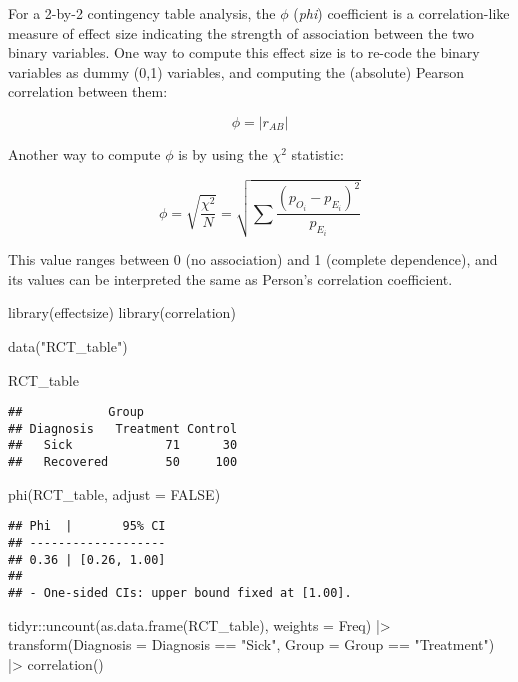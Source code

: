 \documentclass[
]{article}
\newenvironment{Shaded}{\begin{snugshade}}{\end{snugshade}}
\newcommand{\AttributeTok}[1]{\textcolor[rgb]{0.77,0.63,0.00}{#1}}
\newcommand{\ConstantTok}[1]{\textcolor[rgb]{0.00,0.00,0.00}{#1}}
\newcommand{\FunctionTok}[1]{\textcolor[rgb]{0.00,0.00,0.00}{#1}}
\newcommand{\NormalTok}[1]{#1}
\newcommand{\SpecialCharTok}[1]{\textcolor[rgb]{0.00,0.00,0.00}{#1}}
\newcommand{\StringTok}[1]{\textcolor[rgb]{0.31,0.60,0.02}{#1}}
\begin{document}
For a 2-by-2 contingency table analysis, the \(\phi\) (\emph{phi})
coefficient is a correlation-like measure of effect size indicating the
strength of association between the two binary variables. One way to
compute this effect size is to re-code the binary variables as dummy
(0,1) variables, and computing the (absolute) Pearson correlation
between them:

\[
\phi = |r_{AB}|
\]

Another way to compute \(\phi\) is by using the \(\chi^2\) statistic:

\[
\phi = \sqrt{\frac{\chi^2}{N}} = \sqrt{\sum{\frac{(p_{O_i}-p_{E_i})^2}{p_{E_i}}}}
\]

This value ranges between 0 (no association) and 1 (complete
dependence), and its values can be interpreted the same as Person's
correlation coefficient.

\begin{Shaded}
\begin{Highlighting}[]
\FunctionTok{library}\NormalTok{(effectsize)}
\FunctionTok{library}\NormalTok{(correlation)}

\FunctionTok{data}\NormalTok{(}\StringTok{"RCT\_table"}\NormalTok{)}

\NormalTok{RCT\_table}
\end{Highlighting}
\end{Shaded}

\begin{verbatim}
##            Group
## Diagnosis   Treatment Control
##   Sick             71      30
##   Recovered        50     100
\end{verbatim}

\begin{Shaded}
\begin{Highlighting}[]
\FunctionTok{phi}\NormalTok{(RCT\_table, }\AttributeTok{adjust =} \ConstantTok{FALSE}\NormalTok{)}
\end{Highlighting}
\end{Shaded}

\begin{verbatim}
## Phi  |       95% CI
## -------------------
## 0.36 | [0.26, 1.00]
## 
## - One-sided CIs: upper bound fixed at [1.00].
\end{verbatim}

\begin{Shaded}
\begin{Highlighting}[]
\NormalTok{tidyr}\SpecialCharTok{::}\FunctionTok{uncount}\NormalTok{(}\FunctionTok{as.data.frame}\NormalTok{(RCT\_table), }\AttributeTok{weights =}\NormalTok{ Freq) }\SpecialCharTok{|\textgreater{}}
  \FunctionTok{transform}\NormalTok{(}\AttributeTok{Diagnosis =}\NormalTok{ Diagnosis }\SpecialCharTok{==} \StringTok{"Sick"}\NormalTok{,}
            \AttributeTok{Group =}\NormalTok{ Group }\SpecialCharTok{==} \StringTok{"Treatment"}\NormalTok{) }\SpecialCharTok{|\textgreater{}} 
  \FunctionTok{correlation}\NormalTok{()}
\end{Highlighting}
\end{Shaded}
\end{document}
